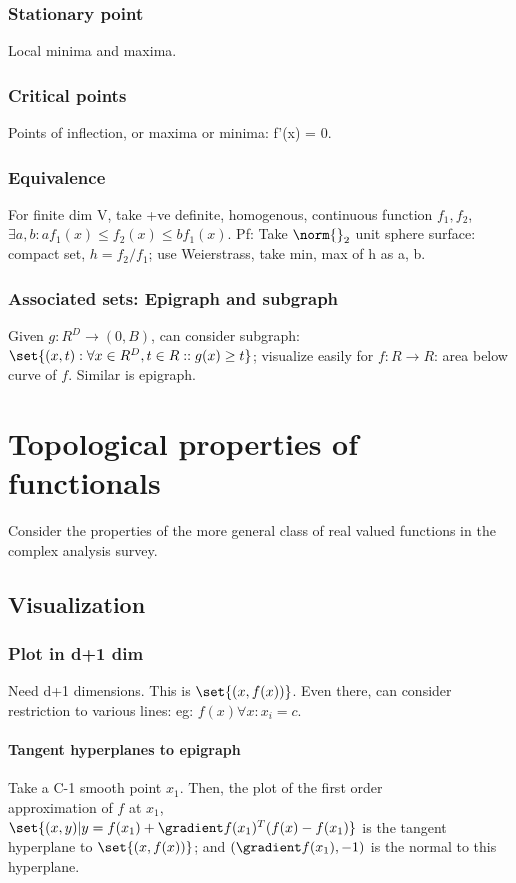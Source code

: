 \documentclass[oneside, article]{memoir}
\begin{document}
\subsubsection{Stationary point}
Local minima and maxima.

\subsubsection{Critical points}
Points of inflection, or maxima or minima: f'(x) = 0.


\subsubsection{Equivalence}
For finite dim V, take +ve definite, homogenous, continuous function $f_{1}, f_{2}$, $\exists a, b: af_{1}(x) \leq f_{2}(x) \leq b f_{1}(x)$. Pf: Take $\norm{}_{2}$ unit sphere surface: compact set, $h = f_{2}/f_{1}$; use Weierstrass, take min, max of h as a, b.

\subsubsection{Associated sets: Epigraph and subgraph}
Given $g: R^{D} \to (0,B)$, can consider subgraph:\\ $\set{(x, t): \forall x \in R^{D}, t \in R:: g(x) \geq t}$; visualize easily for $f:R \to R$: area below curve of $f$. Similar is epigraph.

\section{Topological properties of functionals}
Consider the properties of the more general class of real valued functions in the complex analysis survey.

\subsection{Visualization}
\subsubsection{Plot in d+1 dim}
Need d+1 dimensions. This is $\set{(x, f(x))}$. Even there, can consider restriction to various lines: eg: $f(x) \forall x: x_i = c$.

\paragraph{Tangent hyperplanes to epigraph}
Take a C-1 smooth point $x_1$. Then, the plot of the first order  \\
approximation of $f$ at $x_1$,
$\set{(x, y)| y = f(x_1) + \gradient f(x_1)^T(f(x) - f(x_1)}$ is the tangent hyperplane to $\set{(x, f(x))}$; and $(\gradient f(x_1), -1)$ is the normal to this hyperplane.
\end{document}
